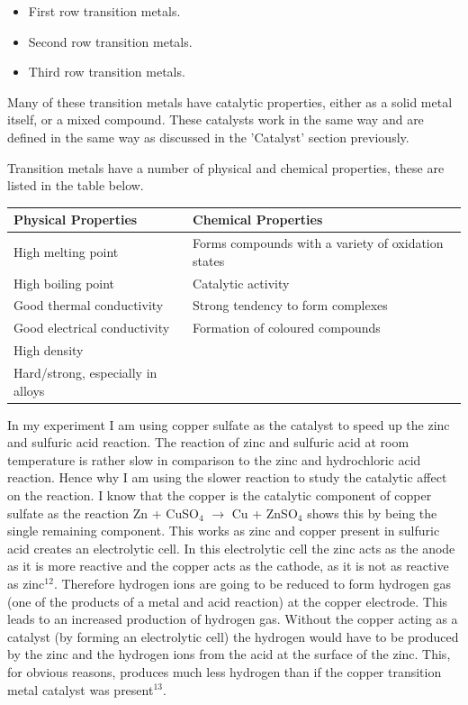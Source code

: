 \begin{itemize}
\item First row transition metals.
\item Second row transition metals.
\item Third row transition metals.
\end{itemize}

Many of these transition metals have catalytic properties, either as a solid metal itself, or a mixed compound. These catalysts work in the same way and are defined in the same way as discussed in the 'Catalyst' section previously.

Transition metals have a number of physical and chemical properties, these are listed in the table below.

\begin{center}
\begin{tabular}{|l|l|}
    \hline
    \textbf{Physical Properties} & \textbf{Chemical Properties} \\ \hline
High melting point & Forms compounds with a variety of oxidation states \\ \hline
High boiling point & Catalytic activity \\ \hline
Good thermal conductivity & Strong tendency to form complexes \\ \hline
Good electrical conductivity & Formation of coloured compounds \\ \hline
High density & \\ \hline
Hard/strong, especially in alloys & \\ \hline
\end{tabular}

\label{tab:Transition Metal Properties}
\end{center}

In my experiment I am using copper sulfate as the catalyst to speed up the zinc and sulfuric acid reaction. The reaction of zinc and sulfuric acid at room temperature is rather slow in comparison to the zinc and hydrochloric acid reaction. Hence why I am using the slower reaction to study the catalytic affect on the reaction. I know that the copper is the catalytic component of copper sulfate as the reaction Zn + CuSO$_4$ $\rightarrow$ Cu + ZnSO$_4$ shows this by being the single remaining component. This works as zinc and copper present in sulfuric acid creates an electrolytic cell. In this electrolytic cell the zinc acts as the anode as it is more reactive and the copper acts as the cathode, as it is not as reactive as zinc$^{12}$. Therefore hydrogen ions are going to be reduced to form hydrogen gas (one of the products of a metal and acid reaction) at the copper electrode. This leads to an increased production of hydrogen gas. Without the copper acting as a catalyst (by forming an electrolytic cell) the hydrogen would have to be produced by the zinc and the hydrogen ions from the acid at the surface of the zinc. This, for obvious reasons, produces much less hydrogen than if the copper transition metal catalyst was present$^{13}$.



